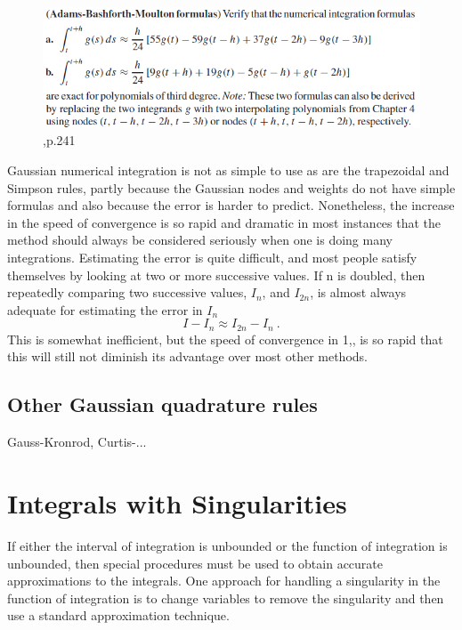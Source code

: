 \documentclass[12pt]{article}
\theoremstyle{theorem}
\begin{document}
\begin{figure}[h!]
	\centering
	\includegraphics[scale=0.8]{Figures/50}
	\caption{\cite{CheK07},p.241}
	\label{fig:50}
\end{figure}

\begin{shaded}
 Gaussian numerical integration is not as simple to use as are the trapezoidal and Simpson rules, partly because the Gaussian nodes and weights do not have simple formulas and also because the error is harder to predict. Nonetheless, the increase in the speed of convergence is so rapid and dramatic in most instances that the method should 
 always be considered seriously when one is doing many integrations. Estimating the error is quite difficult, and most people satisfy themselves by looking at two or more 
 successive values. If n is doubled, then repeatedly comparing two successive values, $I_n$, and $I_{2n}$, is almost always adequate for estimating the error in $I_n$
%
\[ I-I_n \approx I_{2n} - I_n \ . \]%
This is somewhat inefficient, but the speed of convergence in 1,, is so rapid that this will still not diminish its advantage over most other methods. 
\end{shaded}

\subsection{Other Gaussian quadrature rules} 
Gauss-Kronrod, Curtis-...

\cleardoublepage

\section{Integrals with Singularities}
If either the interval of integration is unbounded or the function of integration is unbounded,
then special procedures must be used to obtain accurate approximations to the integrals.
One approach for handling a singularity in the function of integration is to change
variables to remove the singularity and then use a standard approximation technique.
\end{document}
